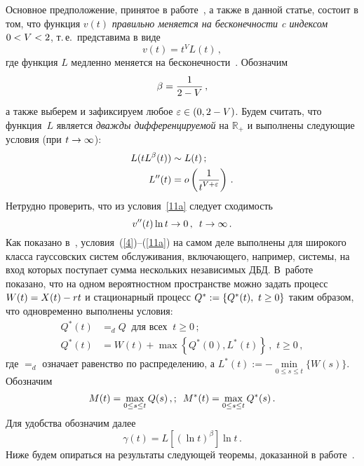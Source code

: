 \begin{multicols}{2}
Основное предположение, принятое в работе~\cite{Lukashenko}, а также
в данной статье, состоит в том, что функция  $v(t)$ {\it правильно
меняется на бесконечности c индексом} $0\hm<V\hm<2$, т.\,е.\ представима в виде
\begin{equation}
v(t)=t^V L(t)\,,\label{4}
\end{equation}
где функция $L$  медленно меняется на бесконеч\-ности~\cite{Seneta}.
Обозначим 
$$
\beta=\displaystyle\frac{\displaystyle 1\mathstrut}{\displaystyle 2-V\mathstrut}\,,
$$ 
а также выберем и зафиксируем
любое $\varepsilon \hm\in (0,2-V)$. Будем  считать, что функция~$L$
является {\it дважды дифференцируемой} на $\mathbb{R}_+$ и выполнены
следующие условия (при $t \hm\to \infty$):
\begin{align}
L(tL^\beta(t)) &\sim L(t)\,;\label{10}\\
L''(t)&=o\left( \displaystyle\frac{\displaystyle 1\mathstrut}{\displaystyle t^{V+\varepsilon}\mathstrut} \right)\,.\label{11a}
\end{align}
Нетрудно проверить, что из условия~\eqref{11a} следует сходимость
\begin{equation}
v''(t)\ln t \to 0\,,\enskip t \to \infty\,.\label{2.2.l20}
\end{equation}
Как показано в~\cite{Lukashenko},  условия~(\ref{4})--(\ref{11a}) на
самом деле выполнены для широкого класса гауссовских сис\-тем
обслуживания, включающего, например, сис\-те\-мы, на вход которых
поступает сумма нескольких независимых ДБД.
 В~работе~\cite{Konstantopoulos} показано, что на одном вероятностном пространстве можно
 задать процесс $W(t)\hm=X(t)\hm-rt$ и стационарный процесс $Q^*:=\{Q^*(t),\ t \hm\geq 0\}$
таким образом, что одновременно выполнены условия:
\begin{align*}
Q^*(t)&=_d Q \ \mbox{ для всех } \ t \geq 0\,; %
\\
Q^*(t)&=W(t)+\max\left\{Q^*(0), L^*(t)\right\}\,,\,\,t \geq 0\,, %
\end{align*}
где $=_d$ означает равенство по распределению, а
$L^*(t):=-\min\limits_{0\le s\le t}\{W(s)\}$. Обозначим
\begin{equation*}
M(t)=\max\limits_{0 \leq s \leq t}Q(s)\,,;\enskip M^*(t)=\max_{0 \leq s \leq
t}Q^*(s)\,.
\end{equation*}
Для удобства обозначим далее
\begin{equation*}
\gamma(t)=L\left[\left(\ln t \right)^\beta\right]  \ln t \,.
\end{equation*}
Ниже будем опираться на результаты следующей теоремы, доказанной
в работе~\cite{Lukashenko}.

\medskip


\end{multicols}
